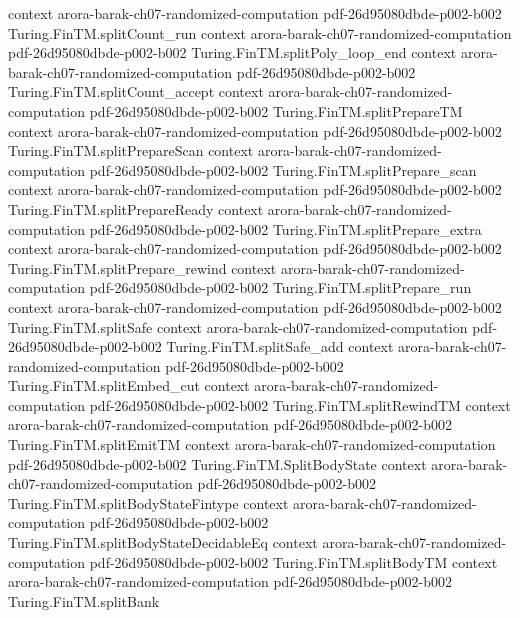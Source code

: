\begin{theorem}
  {context}
  {arora-barak-ch07-randomized-computation}
  {pdf-26d95080dbde-p002-b002}
\proofstep
  {Turing.FinTM.splitCount_run}
  {context}
  {arora-barak-ch07-randomized-computation}
  {pdf-26d95080dbde-p002-b002}
\proofstep
  {Turing.FinTM.splitPoly_loop_end}
  {context}
  {arora-barak-ch07-randomized-computation}
  {pdf-26d95080dbde-p002-b002}
\proofstep
  {Turing.FinTM.splitCount_accept}
  {context}
  {arora-barak-ch07-randomized-computation}
  {pdf-26d95080dbde-p002-b002}
\proofstep
  {Turing.FinTM.splitPrepareTM}
  {context}
  {arora-barak-ch07-randomized-computation}
  {pdf-26d95080dbde-p002-b002}
\proofstep
  {Turing.FinTM.splitPrepareScan}
  {context}
  {arora-barak-ch07-randomized-computation}
  {pdf-26d95080dbde-p002-b002}
\proofstep
  {Turing.FinTM.splitPrepare_scan}
  {context}
  {arora-barak-ch07-randomized-computation}
  {pdf-26d95080dbde-p002-b002}
\proofstep
  {Turing.FinTM.splitPrepareReady}
  {context}
  {arora-barak-ch07-randomized-computation}
  {pdf-26d95080dbde-p002-b002}
\proofstep
  {Turing.FinTM.splitPrepare_extra}
  {context}
  {arora-barak-ch07-randomized-computation}
  {pdf-26d95080dbde-p002-b002}
\proofstep
  {Turing.FinTM.splitPrepare_rewind}
  {context}
  {arora-barak-ch07-randomized-computation}
  {pdf-26d95080dbde-p002-b002}
\proofstep
  {Turing.FinTM.splitPrepare_run}
  {context}
  {arora-barak-ch07-randomized-computation}
  {pdf-26d95080dbde-p002-b002}
\proofstep
  {Turing.FinTM.splitSafe}
  {context}
  {arora-barak-ch07-randomized-computation}
  {pdf-26d95080dbde-p002-b002}
\proofstep
  {Turing.FinTM.splitSafe_add}
  {context}
  {arora-barak-ch07-randomized-computation}
  {pdf-26d95080dbde-p002-b002}
\proofstep
  {Turing.FinTM.splitEmbed_cut}
  {context}
  {arora-barak-ch07-randomized-computation}
  {pdf-26d95080dbde-p002-b002}
\proofstep
  {Turing.FinTM.splitRewindTM}
  {context}
  {arora-barak-ch07-randomized-computation}
  {pdf-26d95080dbde-p002-b002}
\proofstep
  {Turing.FinTM.splitEmitTM}
  {context}
  {arora-barak-ch07-randomized-computation}
  {pdf-26d95080dbde-p002-b002}
\proofstep
  {Turing.FinTM.SplitBodyState}
  {context}
  {arora-barak-ch07-randomized-computation}
  {pdf-26d95080dbde-p002-b002}
\proofstep
  {Turing.FinTM.splitBodyStateFintype}
  {context}
  {arora-barak-ch07-randomized-computation}
  {pdf-26d95080dbde-p002-b002}
\proofstep
  {Turing.FinTM.splitBodyStateDecidableEq}
  {context}
  {arora-barak-ch07-randomized-computation}
  {pdf-26d95080dbde-p002-b002}
\proofstep
  {Turing.FinTM.splitBodyTM}
  {context}
  {arora-barak-ch07-randomized-computation}
  {pdf-26d95080dbde-p002-b002}
\proofstep
  {Turing.FinTM.splitBank}

\end{theorem}
